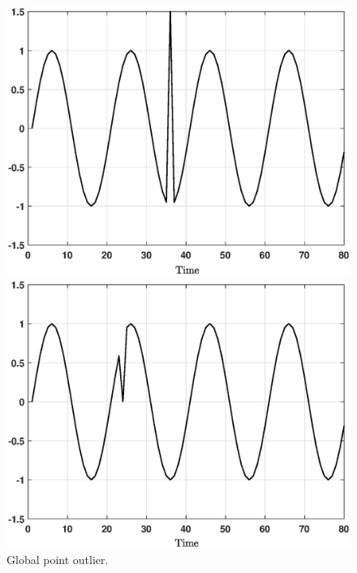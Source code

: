 \vspace{-0.25cm}
\begin{figure}[h]
	\begin{minipage}{0.33\textwidth}
		\centering
		\includegraphics[scale=0.25]{introduction/Point_anomaly}
		\vspace{-0.5cm}
		\caption{Global point outlier.}
		\label{fig:intro_point}
	\end{minipage}
		\vspace{-0.15cm}
	\begin{minipage}{0.33\textwidth}
		\centering
		\includegraphics[scale=0.25]{introduction/Contextual_anomaly}
		\vspace{-0.5cm}

\end{minipage}
\end{figure}
